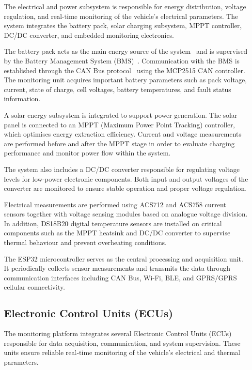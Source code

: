 The electrical and power subsystem is responsible for energy distribution, voltage regulation, and real-time monitoring of the vehicle's electrical parameters. The system integrates the battery pack, solar charging subsystem, MPPT controller, DC/DC converter, and embedded monitoring electronics.

The battery pack acts as the main energy source of the system~\cite{bakobattery} and is supervised by the Battery Management System (BMS)~\cite{ocellspec}. Communication with the BMS is established through the CAN Bus protocol~\cite{bakocan} using the MCP2515 CAN controller. The monitoring unit acquires important battery parameters such as pack voltage, current, state of charge, cell voltages, battery temperatures, and fault status information.

A solar energy subsystem is integrated to support power generation. The solar panel is connected to an MPPT (Maximum Power Point Tracking) controller, which optimises energy extraction efficiency. Current and voltage measurements are performed before and after the MPPT stage in order to evaluate charging performance and monitor power flow within the system.

The system also includes a DC/DC converter responsible for regulating voltage levels for low-power electronic components. Both input and output voltages of the converter are monitored to ensure stable operation and proper voltage regulation.

Electrical measurements are performed using ACS712 and ACS758 current sensors together with voltage sensing modules based on analogue voltage division. In addition, DS18B20 digital temperature sensors are installed on critical components such as the MPPT heatsink and DC/DC converter to supervise thermal behaviour and prevent overheating conditions.

The ESP32 microcontroller serves as the central processing and acquisition unit. It periodically collects sensor measurements and transmits the data through communication interfaces including CAN Bus, Wi-Fi, BLE, and GPRS/GPRS cellular connectivity.

\subsection{Electronic Control Units (ECUs)}

The monitoring platform integrates several Electronic Control Units (ECUs) responsible for data acquisition, communication, and system supervision. These units ensure reliable real-time monitoring of the vehicle's electrical and thermal parameters.

